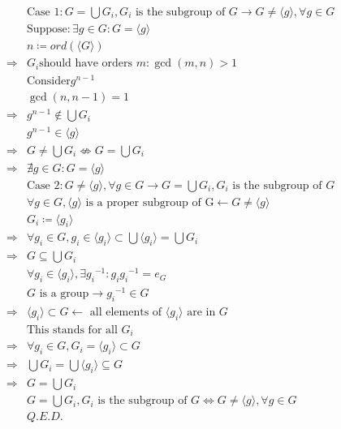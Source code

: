 \documentclass{article}
\begin{document}
\begin{equation*}
    \begin{split}
        &\text{Case 1} :G=\bigcup G_i,G_i\text{ is the subgroup of }G\rightarrow G\ne \langle g\rangle,\forall g\in G\\
        &\text{Suppose}:\exists g\in G:G=\langle g\rangle\\
        &n\coloneqq ord(\langle G\rangle)\\
        \Rightarrow&G_i \text{should have orders }m:\gcd(m,n)>1\\
        &\text{Consider} g^{n-1}\\
        &\gcd(n,n-1)=1\\
        \Rightarrow&g^{n-1}\notin \bigcup G_i\\
        &g^{n-1}\in \langle g\rangle\\
        \Rightarrow&G\ne\bigcup G_i\nLeftrightarrow G=\bigcup G_i\\
        \Rightarrow&\nexists g\in G:G=\langle g\rangle\\
        &\text{Case 2} :G\ne \langle g\rangle,\forall g\in G\rightarrow G=\bigcup G_i,G_i\text{ is the subgroup of }G \\
        &\forall g\in G,\langle g\rangle\text{ is a proper subgroup of G}\leftarrow G\ne \langle g\rangle\\
        &G_i\coloneqq \langle g_i\rangle\\
        \Rightarrow&\forall g_i\in G,g_i\in\langle g_i\rangle\subset \bigcup \langle g_i\rangle=\bigcup G_i\\
        \Rightarrow&G\subseteq \bigcup G_i\\
        &\forall g_i\in\langle g_i\rangle,\exists {g_i}^{-1}:g_i{g_i}^{-1}=e_G\\
        &G\text{ is a group}\rightarrow{g_i}^{-1}\in G\\
        \Rightarrow&\langle g_i\rangle\subset G\leftarrow \text{ all elements of }\langle g_i\rangle\text{ are in }G\\
        &\text{This stands for all }G_i\\
        \Rightarrow&\forall g_i\in G,G_i=\langle g_i\rangle\subset G\\
        \Rightarrow&\bigcup G_i=\bigcup \langle g_i\rangle\subseteq G\\
        \Rightarrow&G=\bigcup G_i\\
        &G=\bigcup G_i,G_i\text{ is the subgroup of }G\Leftrightarrow G\ne \langle g\rangle,\forall g\in G\\
        &Q.E.D.\\
    \end{split}
\end{equation*}
\end{document}
